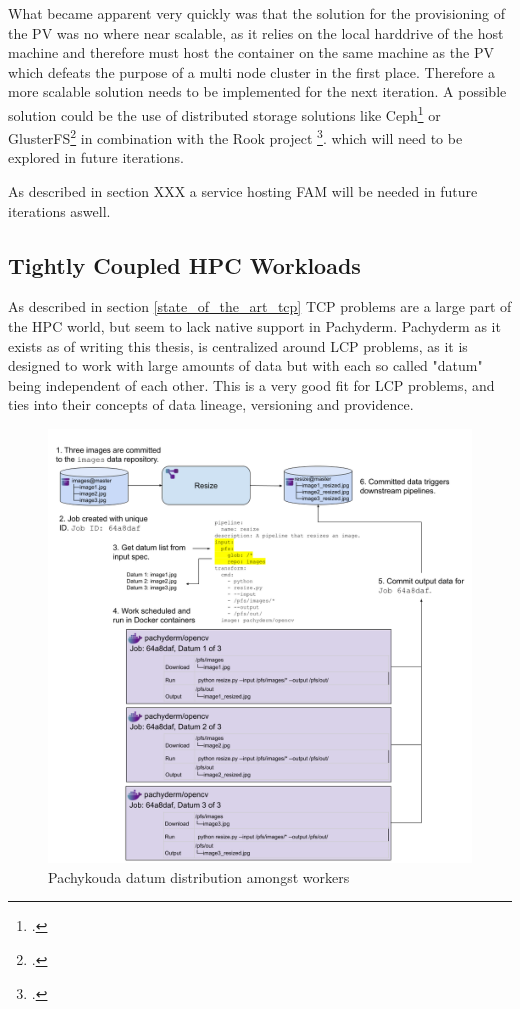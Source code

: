 What became apparent very quickly was that the solution for the provisioning of the \ac{PV} was no where near scalable,
as it relies on the local harddrive of the host machine and therefore must host the container on the same machine as the \ac{PV} which defeats the purpose of a multi node cluster in the first place.
Therefore a more scalable solution needs to be implemented for the next iteration.
A possible solution could be the use of distributed storage solutions like Ceph\footcite{CephIoHome} or GlusterFS\footcite{Gluster}  in combination with the Rook project \footcite{Rook}. 
which will need to be explored in future iterations.


As described in section XXX a service hosting \ac{FAM} will be needed in future iterations aswell.

\subsection{Tightly Coupled HPC Workloads} 
\label{tcp_hpc_workloads}

As described in section \ref{state_of_the_art_tcp} \ac{TCP} problems are a large part of the \ac{HPC} world,  but seem to lack native support in Pachyderm.
Pachyderm as it exists as of writing this thesis, is centralized around \ac{LCP} problems, as it is designed to work with large amounts of data but with each so called "datum" being independent of each other.
This is a very good fit for \ac{LCP} problems, and ties into their concepts of data lineage, versioning and providence.

\begin{figure}[htb]
    \centering
    \includegraphics[width=14cm]{graphics/datum_distribution_amongst workers.png}
    \caption[Pachykouda datum distribution amongst workers]{Pachykouda datum distribution amongst workers \footnotemark}
    \label{abb:datum_distribution_amongst workers}
\end{figure}


